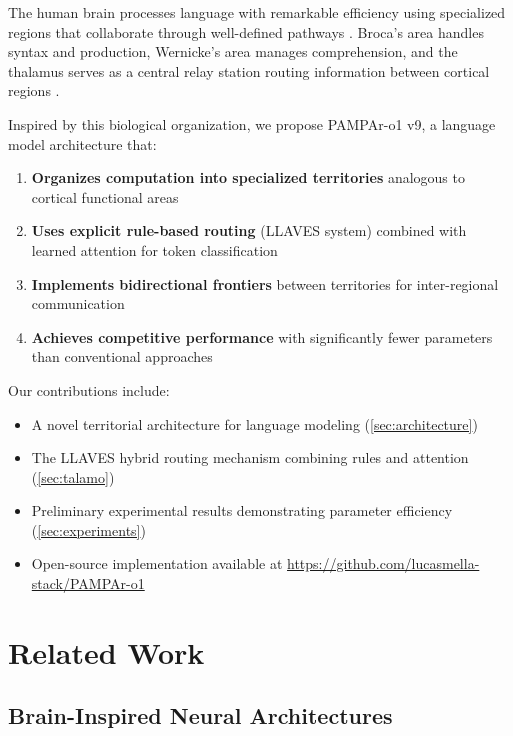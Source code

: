 \documentclass[11pt,a4paper]{article}
\begin{document}
The human brain processes language with remarkable efficiency using specialized regions that collaborate through well-defined pathways \citep{fedorenko2014reworking}. Broca's area handles syntax and production, Wernicke's area manages comprehension, and the thalamus serves as a central relay station routing information between cortical regions \citep{sherman2006thalamus}.

Inspired by this biological organization, we propose PAMPAr-o1 v9, a language model architecture that:

\begin{enumerate}
    \item \textbf{Organizes computation into specialized territories} analogous to cortical functional areas
    \item \textbf{Uses explicit rule-based routing} (LLAVES system) combined with learned attention for token classification
    \item \textbf{Implements bidirectional frontiers} between territories for inter-regional communication
    \item \textbf{Achieves competitive performance} with significantly fewer parameters than conventional approaches
\end{enumerate}

Our contributions include:
\begin{itemize}
    \item A novel territorial architecture for language modeling (\cref{sec:architecture})
    \item The LLAVES hybrid routing mechanism combining rules and attention (\cref{sec:talamo})
    \item Preliminary experimental results demonstrating parameter efficiency (\cref{sec:experiments})
    \item Open-source implementation available at \url{https://github.com/lucasmella-stack/PAMPAr-o1}
\end{itemize}

\section{Related Work}
\label{sec:related}

\subsection{Brain-Inspired Neural Architectures}
\end{document}
